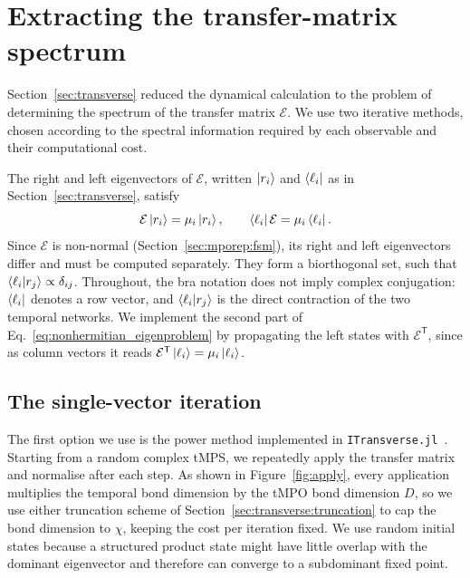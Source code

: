 \FloatBarrier
\section{Extracting the transfer-matrix spectrum}
\label{sec:numerics}
\label{sec:nonhermitian}

Section~\ref{sec:transverse} reduced the dynamical calculation to the problem of determining the spectrum of the transfer matrix $\mathcal{E}$. We use two iterative methods, chosen according to the spectral information required by each observable and their computational cost.

The right and left eigenvectors of $\mathcal{E}$, written $\ket{r_i}$ and $\bra{\ell_i}$ as in Section~\ref{sec:transverse}, satisfy
\begin{equation}
  \mathcal{E}\ket{r_i}=\mu_i\ket{r_i},
  \qquad
  \bra{\ell_i}\mathcal{E}=\mu_i\bra{\ell_i}.
  \label{eq:nonhermitian_eigenproblem}
\end{equation}
Since $\mathcal{E}$ is non-normal (Section~\ref{sec:mporep:fsm}), its right and left eigenvectors differ and must be computed separately. They form a biorthogonal set, such that $\braket{\ell_i}{r_j}\propto\delta_{ij}$. Throughout, the bra notation does not imply complex conjugation: $\bra{\ell_i}$ denotes a row vector, and $\braket{\ell_i}{r_j}$ is the direct contraction of the two temporal networks. We implement the second part of Eq.~\eqref{eq:nonhermitian_eigenproblem} by propagating the left states with $\mathcal{E}^{\mathsf T}$, since as column vectors it reads $\mathcal{E}^{\mathsf T}\ket{\ell_i}=\mu_i\ket{\ell_i}$.

\subsection{The single-vector iteration}
\label{sec:svpm}

The first option we use is the power method implemented in \texttt{ITransverse.jl}~\cite{carignano2025itransverse}. Starting from a random complex \ac{tMPS}, we repeatedly apply the transfer matrix and normalise after each step. As shown in Figure~\ref{fig:apply}, every application multiplies the temporal bond dimension by the \ac{tMPO} bond dimension $D$, so we use either truncation scheme of Section~\ref{sec:transverse:truncation} to cap the bond dimension to $\chi$, keeping the cost per iteration fixed. We use random initial states because a structured product state might have little overlap with the dominant eigenvector and therefore can converge to a subdominant fixed point.

